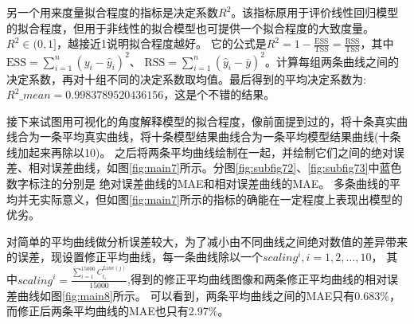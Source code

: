\documentclass{article}
\begin{document}
另一个用来度量拟合程度的指标是决定系数$R^2$。该指标原用于评价线性回归模型的拟合程度，但用于非线性的拟合模型也可提供一个拟合程度的大致度量。
$R^2\in(0,1]$，越接近1说明拟合程度越好。
它的公式是$ R^2 = 1 - \frac{\text{ESS}}{\text{TSS}} = \frac{\text{RSS}}{\text{TSS}}$，其中$\text{ESS} = \sum_{i=1}^{n} (y_i - \hat{y}_i)^2$、 
$ \text{RSS} = \sum_{i=1}^{n} (\hat{y}_i - \bar{y})^2 $。计算每组两条曲线之间的决定系数，再对十组不同的决定系数取均值。最后得到的平均决定系数为:
$R^2\_mean=0.9983789520436156$，这是个不错的结果。

接下来试图用可视化的角度解释模型的拟合程度，像前面提到过的，将十条真实曲线合为一条平均真实曲线，将十条模型结果曲线合为一条平均模型结果曲线(十条线加起来再除以10)。
之后将两条平均曲线绘制在一起，并绘制它们之间的绝对误差、相对误差曲线，如图\ref{fig:main7}所示。分图\ref{fig:subfig72}、\ref{fig:subfig73}中蓝色数字标注的分别是
绝对误差曲线的MAE和相对误差曲线的MAE。
多条曲线的平均并无实际意义，但如图\ref{fig:main7}所示的指标的确能在一定程度上表现出模型的优劣。

对简单的平均曲线做分析误差较大，为了减小由不同曲线之间绝对数值的差异带来的误差，现设置修正平均曲线，每一条曲线除以一个$scaling^i,i=1,2,\dots,10$，
其中$scaling^i = \frac{\sum_{i = 1}^{15000} C^{Line(j)}_{t_{i}}}{15000}$,得到的修正平均曲线图像和两条修正平均曲线的相对误差曲线如图\ref{fig:main8}所示。
可以看到，两条平均曲线之间的MAE只有0.683\%，而修正后两条平均曲线的MAE也只有2.97\%。
\end{document}
